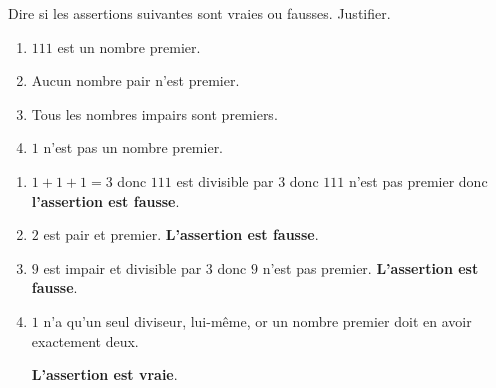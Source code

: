\begin{exercice*}
    Dire si les assertions suivantes sont vraies ou fausses. Justifier.
    \begin{enumerate}
        \item $111$ est un nombre premier.
        \item Aucun nombre pair n'est premier.
        \item Tous les nombres impairs sont premiers.
        \item $1$ n'est pas un nombre premier.
    \end{enumerate}

\end{exercice*}
\begin{corrige}
    \begin{enumerate}
        \item $1+1+1 = 3$ donc $111$ est divisible par $3$ donc $111$ n'est pas premier donc \textbf{l'assertion est fausse}.
        \item $2$ est pair et premier. \textbf{L'assertion est fausse}.
        \item $9$ est impair et divisible par $3$ donc $9$ n'est pas premier. \textbf{L'assertion est fausse}.
        \item $1$ n'a qu'un seul diviseur, lui-même, or un nombre premier doit en avoir exactement deux.
        
        \textbf{L'assertion est vraie}.
    \end{enumerate}
\end{corrige}

